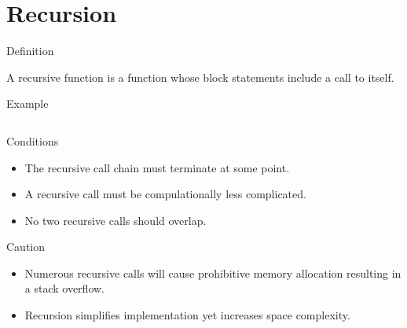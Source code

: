 \documentclass[compress]{beamer}
\begin{document}
\prepareCover

\section{Recursion}

\begin{slide}
	\begin{block}{Definition}

	A recursive function is a function whose block statements include a call to itself.

	\end{block}
\end{slide}

\begin{slide}
	\begin{block}{Example}

	\inputminted[fontsize=\scriptsize, firstline=10, linenos]{c}{
		\resDirectory/hellos.c
	}

	\end{block}
\end{slide}

\begin{slide}
	\begin{block}{Conditions}

	\begin{itemize}
	\item[] The recursive call chain must terminate at some point.
	\item[] A recursive call must be compulationally less complicated.
	\item[] No two recursive calls should overlap.
	\end{itemize}

	\end{block}
\end{slide}

\begin{slide}
	\begin{block}{Caution}

	\begin{itemize}
	\item[] Numerous recursive calls will cause prohibitive memory allocation resulting in a stack overflow.
	\item[] Recursion simplifies implementation yet increases space complexity.
	\end{itemize}

	\end{block}
\end{slide}
\end{document}
